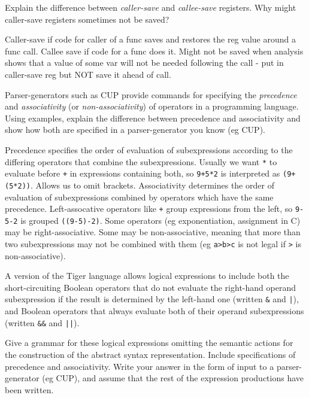 \documentclass[11pt]{cityexam}
\begin{document}
\begin{questions}
\begin{subquestions}
\subquestion
Explain the difference between \emph{caller-save\/} and \emph{callee-save\/}
registers. Why might caller-save registers sometimes not be saved?

\begin{modelanswer}
Caller-save if code for caller of a func saves and restores the reg value
around a func call. Callee save if code for a func does it. Might not be
saved when analysis shows that a value of some var will not be needed following
the call - put in caller-save reg but NOT save it ahead of call.
\end{modelanswer}
\end{subquestions}

\clearpage

\question

\begin{subquestions}

\subquestion
Parser-generators such as CUP provide commands for specifying the 
\emph{precedence\/} and \emph{associativity\/} (or \emph{non-associativity})
of operators in a programming language. Using examples, 
explain the difference between precedence and associativity
and show how both are specified in a parser-generator you know (eg CUP).
\begin{modelanswer}
Precedence specifies the order of evaluation of subexpressions 
according to the differing
operators that combine the subexpressions. Usually we want
\verb+*+ to evaluate before \verb!+! in expressions containing
both, so \verb!9+5*2! is interpreted as \verb!(9+(5*2))!. Allows us to
omit brackets. Associativity determines the order of evaluation
of subexpressions combined by operators which have the same precedence.
Left-assocative operators like \verb!+! group expressions from the
left, so \verb!9-5-2! is grouped \verb!((9-5)-2)!. 
Some operators (eg exponentiation, assignment in C) may be right-associative.
Some may be non-associative, meaning that more than two subexpressions
may not be combined with them (eg \verb!a>b>c! is not legal if \verb!>!
is non-associative).
\end{modelanswer}

\subquestion
A version of the Tiger language allows logical expressions to include both
the short-circuiting Boolean operators 
that do not evaluate the right-hand operand subexpression if the
result is determined by the left-hand one (written \verb+&+ and \verb+|+),
and Boolean operators that always evaluate both of their 
operand subexpressions (written \verb+&&+ and \verb+||+).
\begin{subsubquestions}
\subsubquestion
Give a grammar for these logical expressions omitting the semantic
actions for the construction of the abstract syntax representation. Include
specifications of precedence and associativity. Write your answer
in the form of input to a parser-generator (eg CUP),
and assume that the rest of the expression productions have been written.


\end{subsubquestions}
\end{subquestions}
\end{questions}
\end{document}
